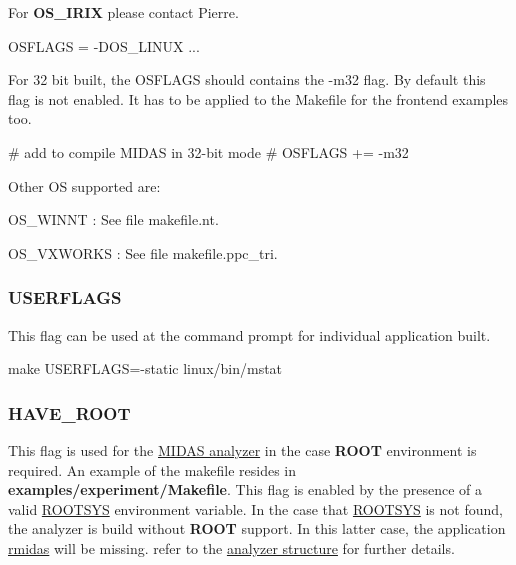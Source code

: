 \begin{DoxyItemize}
\item For {\bfseries OS\_\-IRIX} please contact Pierre. 
\begin{DoxyCode}
OSFLAGS = -DOS_LINUX ...
\end{DoxyCode}

\item For 32 bit built, the OSFLAGS should contains the -\/m32 flag. By default this flag is not enabled. It has to be applied to the Makefile for the frontend examples too. 
\begin{DoxyCode}
# add to compile MIDAS in 32-bit mode
# OSFLAGS += -m32
\end{DoxyCode}

\item Other OS supported are:
\begin{DoxyItemize}
\item OS\_\-WINNT : See file makefile.nt.
\item OS\_\-VXWORKS : See file makefile.ppc\_\-tri.
\end{DoxyItemize}
\end{DoxyItemize}



 \hypertarget{BuildingOptions_BO_USERFLAGS}{}\subsubsection{USERFLAGS}\label{BuildingOptions_BO_USERFLAGS}
This flag can be used at the command prompt for individual application built. 
\begin{DoxyCode}
make USERFLAGS=-static linux/bin/mstat
\end{DoxyCode}


\label{BuildingOptions_idx_ROOT_build-flag}
\hypertarget{BuildingOptions_idx_ROOT_build-flag}{}
 

 \hypertarget{BuildingOptions_BO_HAVE_ROOT}{}\subsubsection{HAVE\_\-ROOT}\label{BuildingOptions_BO_HAVE_ROOT}
This flag is used for the \hyperlink{DataAnalysis_DA_analyzer_utility}{MIDAS analyzer} in the case {\bfseries ROOT} environment is required. An example of the makefile resides in {\bfseries examples/experiment/Makefile}. This flag is enabled by the presence of a valid \hyperlink{BuildingOptions_BO_ROOTSYS}{ROOTSYS} environment variable. In the case that \hyperlink{BuildingOptions_BO_ROOTSYS}{ROOTSYS} is not found, the analyzer is build without {\bfseries ROOT} support. In this latter case, the application \hyperlink{RC_Monitor_RC_rmidas_utility}{rmidas} will be missing. refer to the \hyperlink{DataAnalysis_DA_Midas_Analyzer}{analyzer structure} for further details.

